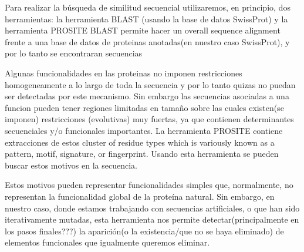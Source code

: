 Para realizar la búsqueda de similitud secuencial utilizaremos, en principio, dos herramientas:  
la herramienta BLAST (usando la base de datos SwissProt) y la herramienta PROSITE
BLAST permite hacer un overall sequence alignment frente a una base de datos de proteinas anotadas(en nuestro caso SwissProt), y por lo tanto se encontraran secuencias 

Algunas funcionalidades en las proteinas no imponen restricciones homogeneamente a lo largo de toda la secuencia y por lo tanto quizas no puedan ser detectadas por este mecanismo.
Sin embargo las secuencias asociadas a una funcion pueden tener regiones limitadas en tamaño sobre las cuales existen(se imponen) restricciones (evolutivas) muy fuertas, ya que contienen determinantes secuenciales y/o funcionales importantes.
La herramienta PROSITE contiene extracciones de estos cluster of residue types which is variously known as a pattern, motif, signature, or fingerprint. 
Usando esta herramienta se pueden buscar estos motivos en la secuencia. 

Estos motivos pueden representar funcionalidades simples que, normalmente, no representan la funcionalidad global de la proteína natural.
Sin embargo, en nuestro caso, donde estamos trabajando con secuencias artificiales, o que han sido iterativamente mutadas, 
esta herramienta nos permite detectar(principalmente en los pasos finales???) la aparición(o la existencia/que no se haya eliminado) de elementos funcionales que igualmente queremos eliminar.  













